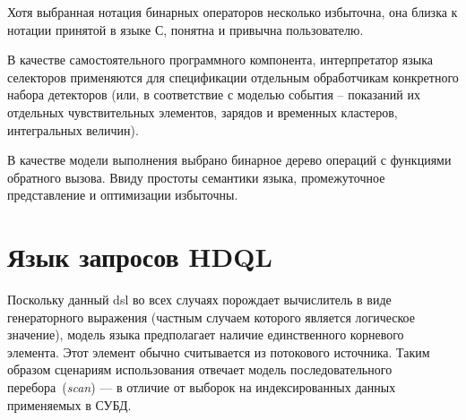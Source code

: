 Хотя выбранная нотация бинарных операторов несколько избыточна, она
близка к нотации принятой в языке С, понятна и привычна пользователю.

В качестве самостоятельного программного компонента, интерпретатор языка
селекторов применяются для спецификации отдельным обработчикам конкретного
набора детекторов (или, в соответствие с моделью события -- показаний их
отдельных чувствительных элементов, зарядов и временных кластеров,
интегральных величин).

В качестве модели выполнения выбрано бинарное дерево операций с функциями
обратного вызова. Ввиду простоты семантики языка, промежуточное
представление и оптимизации избыточны.

\section{Язык запросов HDQL}

Поскольку данный \acrshort{dsl} во всех случаях порождает вычислитель в виде
генераторного выражения (частным случаем которого является логическое значение),
модель языка предполагает наличие единственного корневого элемента.
Этот элемент обычно считывается из потокового источника. Таким образом
сценариям использования отвечает модель последовательного
перебора~(\emph{scan}) --- в отличие от выборок на индексированных
данных применяемых в СУБД.


